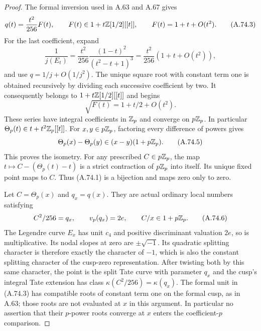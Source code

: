 \begin{proof}
The formal inversion used in A.63 and A.67 gives
\[
 q(t)=\frac{t^2}{256}F(t),\qquad
 F(t)\in1+t\mathbb Z[1/2][[t]],\qquad
                        F(t)=1+t+O(t^2).
\tag{A.74.3}
\]
For the last coefficient, expand
\[
 \frac1{j(E_t)}=
  \frac{t^2}{256}\frac{(1-t)^2}{(t^2-t+1)^3}
                  =\frac{t^2}{256}(1+t+O(t^2)),
\]
and use $q=1/j+O(1/j^2)$.
The unique square root with constant term one is obtained
recursively by dividing each successive coefficient by two.
It consequently belongs to $1+t\mathbb Z[1/2][[t]]$ and begins
\[
                         \sqrt{F(t)}=1+t/2+O(t^2).
\tag{A.74.4}
\]
These series have integral coefficients in $\mathbb Z_p$ and
converge on $p\mathbb Z_p$.
In particular
$\Theta_p(t)\in t+t^2\mathbb Z_p[[t]]$.
For $x,y\in p\mathbb Z_p$, factoring every difference of powers
gives
\[
                \Theta_p(x)-\Theta_p(y)
                         \in(x-y)(1+p\mathbb Z_p).
\tag{A.74.5}
\]
This proves the isometry.  For any prescribed $C\in p\mathbb Z_p$,
the map $t\mapsto C-(\Theta_p(t)-t)$ is a strict contraction
of $p\mathbb Z_p$ into itself.  Its unique fixed point maps to $C$.
Thus (A.74.1) is a bijection and maps zero only to zero.

Let $C=\Theta_p(x)$ and $q_x=q(x)$.
They are actual ordinary local numbers satisfying
\[
                C^2/256=q_x,\qquad
                v_p(q_x)=2e,\qquad
                C/x\in1+p\mathbb Z_p.
\tag{A.74.6}
\]
The Legendre curve $E_x$ has unit $c_4$ and positive
discriminant valuation $2e$, so is multiplicative.
Its nodal slopes at zero are $\pm\sqrt{-1}$.
Its quadratic splitting character is therefore exactly
the character of $-1$, which is also the constant
splitting character of the cusp-zero representation.
After twisting both by this same character, the point
is the split Tate curve with parameter $q_x$ and the
cusp's integral Tate extension has class
$\kappa(C^2/256)=\kappa(q_x)$.
The formal unit in (A.74.3) has compatible roots of
constant term one on the formal cusp, as in A.63;
those roots are not evaluated at $x$ in this argument.
In particular no assertion that their $p$-power roots
converge at $x$ enters the coefficient-$p$ comparison.


\end{proof}
